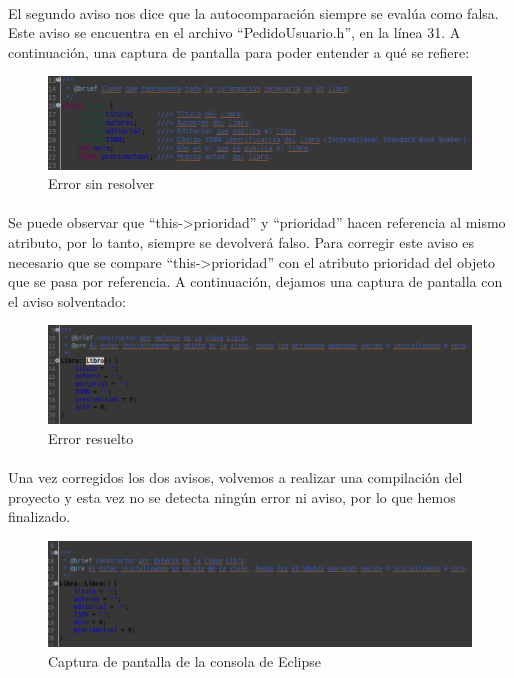 \paragraph{}El segundo aviso nos dice que la autocomparación siempre se evalúa como falsa. Este aviso se encuentra en el archivo “PedidoUsuario.h”, en la línea 31. A continuación, una captura de pantalla para poder entender a qué se refiere:

\begin{figure}[H]
	\centering
	\includegraphics[scale=1]{img/captura12.png}
	\caption{Error sin resolver}
	\label{captura12}
\end{figure}

\paragraph{}Se puede observar que “this->prioridad” y “prioridad” hacen referencia al mismo atributo, por lo tanto, siempre se devolverá falso. Para corregir este aviso es necesario que se compare “this->prioridad” con el atributo prioridad del objeto que se pasa por referencia. A continuación, dejamos una captura de pantalla con el aviso solventado:

\begin{figure}[H]
	\centering
	\includegraphics[scale=0.98]{img/captura13.png}
	\caption{Error resuelto}
	\label{captura13}
\end{figure}

\paragraph{}Una vez corregidos los dos avisos, volvemos a realizar una compilación del proyecto y esta vez no se detecta ningún error ni aviso, por lo que hemos finalizado.

\begin{figure}[H]
	\centering
	\includegraphics[scale=0.39]{img/captura14.png}
	\caption{Captura de pantalla de la consola de Eclipse}
	\label{captura14}
\end{figure}



\newpage
